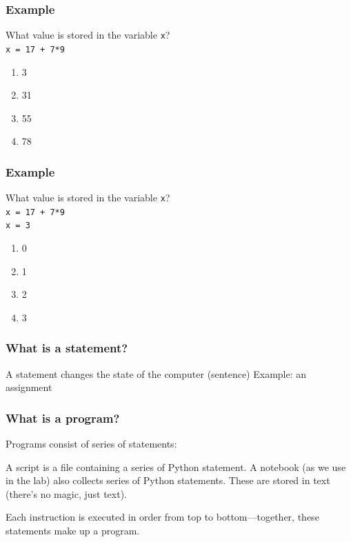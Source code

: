 \documentclass[11pt]{beamer}
\begin{document}
\begin{frame}
  \frametitle{Example}
  \Enlarge

  What value is stored in the variable \texttt{x}? \\
  \texttt{x = 17 + 7*9}
  \begin{enumerate}[label=\Alph*]
  \item  3
  \item  31
  \item  55
  \item  78
  \end{enumerate}
\end{frame}

\begin{frame}
  \frametitle{Example}
  \Enlarge

  What value is stored in the variable \texttt{x}? \\
  \texttt{x = 17 + 7*9} \\
  \texttt{x = 3}
  \begin{enumerate}[label=\Alph*]
  \item  0
  \item  1
  \item  2
  \item  3
  \end{enumerate}
\end{frame}

\begin{frame}
  \frametitle{What is a \textbf{statement}?}
  \Enlarge

  \begin{itemize}
  \myitem  A statement changes the state of the computer (sentence)
  \myitem  Example:  an assignment
  \end{itemize}
\end{frame}

\begin{frame}
  \frametitle{What is a \textbf{program}?}
  \Enlarge

  \begin{itemize}
  \myitem  Programs consist of series of statements:
    \begin{itemize}
    \mysubitem  A script is a file containing a series of Python statement.
    \mysubitem  A notebook (as we use in the lab) also collects series of Python statements.
    \mysubitem  These are stored in text (there’s no magic, just text).
  \end{itemize}
  \myitem  Each instruction is executed in order from top to bottom—together, these statements make up a program.
  \end{itemize}
 \end{frame}
\end{document}
